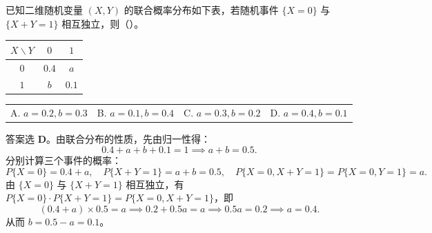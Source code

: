 \documentclass[lang=cn,11pt]{elegantbook}
\begin{document}
\begin{exercise}\label{exer:3-3}
已知二维随机变量 $(X,Y)$ 的联合概率分布如下表，若随机事件 $\{X=0\}$ 与 $\{X+Y=1\}$ 相互独立，则（\quad）。
\begin{center}
\begin{tabular}{c|cc}
\toprule
$X \backslash Y$ & $0$ & $1$ \\
\midrule
$0$ & $0.4$ & $a$ \\
$1$ & $b$ & $0.1$ \\
\bottomrule
\end{tabular}
\end{center}
\begin{tabular}{llll}
A. $a=0.2, b=0.3$ & B. $a=0.1, b=0.4$ & C. $a=0.3, b=0.2$ & D. $a=0.4, b=0.1$
\end{tabular}
\end{exercise}
\begin{solution}
答案选 \textbf{D}。由联合分布的性质，先由归一性得：
\[
0.4 + a + b + 0.1 = 1 \implies a + b = 0.5.
\]
分别计算三个事件的概率：
\[
P\{X=0\} = 0.4 + a, \quad P\{X+Y=1\} = a + b = 0.5, \quad P\{X=0, X+Y=1\} = P\{X=0, Y=1\} = a.
\]
由 $\{X=0\}$ 与 $\{X+Y=1\}$ 相互独立，有 $P\{X=0\} \cdot P\{X+Y=1\} = P\{X=0, X+Y=1\}$，即
\[
(0.4 + a) \times 0.5 = a \implies 0.2 + 0.5a = a \implies 0.5a = 0.2 \implies a = 0.4.
\]
从而 $b = 0.5 - a = 0.1$。
\end{solution}
\end{document}
